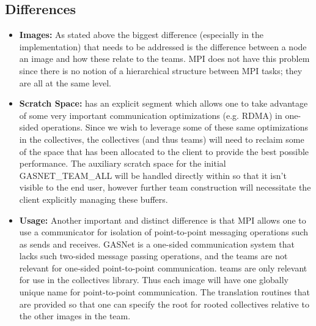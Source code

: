 \documentclass[times,10pt]{article}
\begin{document}
\subsection{Differences}
\begin{itemize}
\item \textbf{\gasnet Images:} As stated above the biggest difference
(especially in the implementation) that needs to be addressed is the difference
between a node an image and how these relate to the teams. MPI does not have
this problem since there is no notion of a hierarchical structure between MPI
tasks; they are all at the same level. 

\item \textbf{Scratch Space:} \gasnet has an explicit segment which allows one
to take advantage of some very important communication optimizations (e.g.
RDMA) in one-sided operations. Since we wish to leverage some of these same
optimizations in the collectives, the collectives (and thus teams) will need to
reclaim some of the space that has been allocated to the \gasnet client to provide
the best possible performance. The auxiliary scratch space for the initial
GASNET\_TEAM\_ALL will be handled directly within \gasnet so  that it isn't
visible to the end user, however further team construction will necessitate the
\gasnet client explicitly managing these buffers.


\item \textbf{Usage:} Another important and distinct difference is that MPI
allows one to use a communicator for isolation of point-to-point messaging operations such as sends and
receives. GASNet is a one-sided communication system that lacks such two-sided
message passing operations, and the teams are not relevant for one-sided
point-to-point communication. \gasnet teams are only relevant for use in the 
collectives library.  Thus each image will have
one globally unique name for point-to-point communication. The translation
routines that are provided so that one can specify the root for rooted
collectives relative to the other images in the team. 

\end{itemize}


\newcommand{\group}[0]{gasnet\_group\_t}
\newcommand{\grouparg}[0]{gasnet\_group\_t\ g}


\newcommand{\team}[0]{gasnet\_team\_t}
\newcommand{\teamarg}[0]{gasnet\_team\_t\ t}
\end{document}
